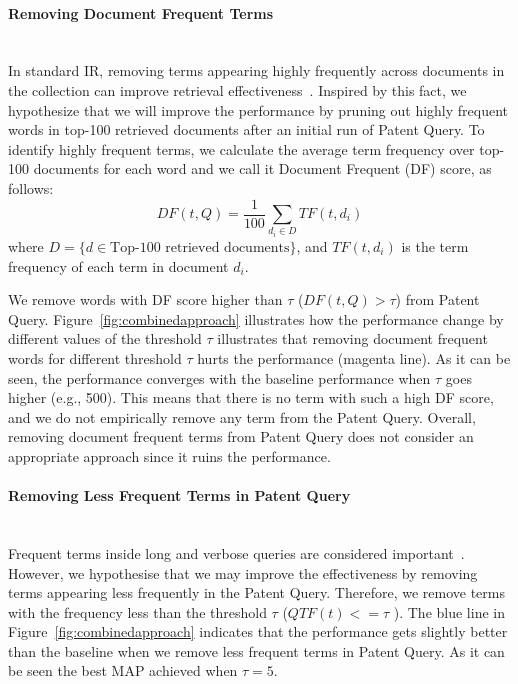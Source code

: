\paragraph{Removing Document Frequent Terms}
\ \\
In standard IR, removing terms appearing highly frequently across documents in the collection can improve retrieval effectiveness~\citep{manning2008introduction}. Inspired by this fact, we hypothesize that we will improve the performance by pruning out highly frequent words in top-100 retrieved documents after an initial run of Patent Query. To identify highly frequent terms, we calculate the average term frequency over top-100 documents for each word and we call it Document Frequent (DF) score, as follows:
\begin{equation}
 DF(t, Q)=\frac{1}{100}\sum_{d_i\in  D} TF(t, d_i)    
 \label{eq:df}
\end{equation}
where $D=\{d\in \mbox{Top-100 retrieved documents}\}$, and $TF(t, d_i)$ is the term frequency of each term in document $d_i$.

We remove words with DF score higher than $\tau$ ($DF(t, Q)>\tau$) from Patent Query. Figure~\ref{fig:combinedapproach} illustrates how the performance change by different values of the threshold $\tau$ illustrates that removing document frequent words for different threshold $\tau$ hurts the performance (magenta line). As it can be seen, the performance converges with the baseline performance when $\tau$ goes higher (e.g., 500). This means that there is no term with such a high DF score, and we do not empirically remove any term from the Patent Query. Overall, removing document frequent terms from Patent Query does not consider an appropriate approach since it ruins the performance. 
\paragraph{Removing Less Frequent Terms in Patent Query}
\ \\
Frequent terms inside long and verbose queries are considered important~\citep{maxwell2013compact}. However, we hypothesise that we may improve the effectiveness by removing terms appearing less frequently in the Patent Query. Therefore, we remove terms with the frequency less than the threshold $\tau$ ($QTF(t)<=\tau$ ). The blue line in Figure~\ref{fig:combinedapproach} indicates that the performance gets slightly better than the baseline when we remove less frequent terms in Patent Query. As it can be seen the best MAP achieved when $\tau=5$. 
